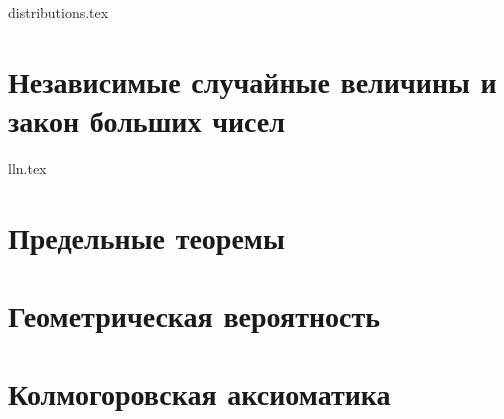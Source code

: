 \documentclass{article}
\theoremstyle{mydef}
\theoremstyle{myth}
\begin{document}
{distributions.tex}

\section{Независимые случайные величины и закон больших чисел}

{lln.tex}

\section{Предельные теоремы}

\section{Геометрическая вероятность}

\section{Колмогоровская аксиоматика}
\end{document}
